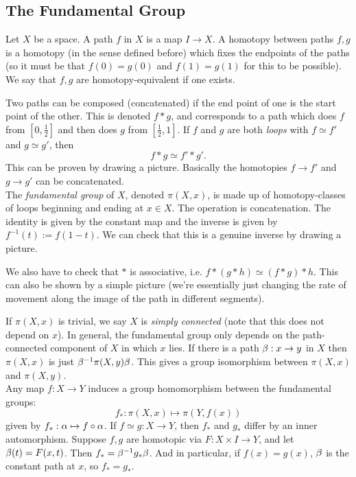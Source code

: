 \documentclass{amsart}
\begin{document}
	 \subsection{The Fundamental Group} Let $X$ be a space. A path $f$ in $X$ is a map $I\to X$. A homotopy between paths $f,g$ is a homotopy (in the sense defined before) which fixes the endpoints of the paths (so it must be that $f(0)=g(0)$ and $f(1)=g(1)$ for this to be possible). We say that $f,g$ are homotopy-equivalent if one exists.
	 
	 Two paths can be composed (concatenated) if the end point of one is the start point of the other. This is denoted $f\ast g$, and corresponds to a path which does $f$ from $[0,\tfrac12]$ and then does $g$ from $[\tfrac12,1]$. If $f$ and $g$ are both \textit{loops} with $f\simeq f'$ and $g\simeq g'$, then 
	 $$
	 f\ast g \simeq f'\ast g'.
	 $$
	 This can be proven by drawing a picture. Basically the homotopies $f\to f'$ and $g\to g'$ can be concatenated.\\
	 
	 The \textit{fundamental group} of $X$, denoted $\pi(X,x)$, is made up of homotopy-classes of loops beginning and ending at $x\in X$. The operation is concatenation. The identity is given by the constant map and the inverse is given by $f^{-1}(t) := f(1-t)$. We can check that this is a genuine inverse by drawing a picture.
	 
	 We also have to check that $\ast$ is associative, i.e. $f\ast (g\ast h) \simeq (f\ast g)\ast h$. This can also be shown by a simple picture (we're essentially just changing the rate of movement along the image of the path in different segments).
	 
	 If $\pi(X,x)$ is trivial, we say $X$ is \textit{simply connected} (note that this does not depend on $x$). In general, the fundamental group only depends on the path-connected component of $X$ in which $x$ lies. If there is a path $\beta:x\to y$ in $X$ then $\pi(X,x)$ is just $\beta^{-1} \pi(X,y) \beta$. This gives a group isomorphism between $\pi(X,x)$ and $\pi(X,y)$.\\
	 
	 Any map $f:X\to Y$ induces a group homomorphism between the fundamental groups:
	 $$
	 f_{*}:\pi(X,x)\mapsto \pi(Y,f(x))
	 $$
	 given by $f_{*}:\alpha \mapsto f\circ \alpha$. If $f\simeq g:X\to Y$, then $f_*$ and $g_*$ differ by an inner automorphism. Suppose $f,g$ are homotopic via $F:X\times I \to Y$, and let $\beta(t) = F(x,t)$. Then $f_* = \beta^{-1}g_*\beta$. And in particular, if $f(x)=g(x)$, $\beta$ is the constant path at $x$, so $f_* = g_*$. 
	 
\end{document}
